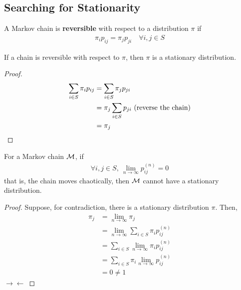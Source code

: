 \documentclass{article}
\newcommand{\upn}[0]{^{(n)}}
\begin{document}
    \subsection{Searching for Stationarity}
    \begin{definition}
    	A Markov chain is \textbf{reversible} with respect to a distribution $\pi$ if 
	    \begin{align}
	    	\pi_i p_{ij} = \pi_j p_{ji}\quad \forall i, j \in S
	    \end{align}
	\end{definition}

	\begin{theorem}
		If a chain is reversible with respect to $\pi$, then $\pi$ is a stationary distribution.
	\end{theorem}
	
	\begin{proof}
		\begin{align}
			\sum_{i \in S} \pi_i p_{ij} &= \sum_{i \in S} \pi_j p_{ji} \\
			&= \pi_j \sum_{i \in S} p_{ji} \text{{ (reverse the chain)}}\\
			&= \pi_j
		\end{align}
	\end{proof}
	
	\begin{proposition}
		For a Markov chain $\mathcal{{M}}$, if
		\begin{align}
			\forall i, j \in S,\ \lim_{n\to\infty} p_{ij}\upn = 0
		\end{align}
		that is, the chain moves chaotically, 
		then $\mathcal{{M}}$ cannot have a stationary distribution.
	\end{proposition}
	
	\begin{proof}
		Suppose, for contradiction, there is a stationary distribution $\pi$. Then,
		\begin{align}
			\pi_j &= \lim_{n \to \infty} \pi_j \\
			&= \lim_{n \to \infty} \sum_{i \in S} \pi_i p_{ij}\upn \\
			&= \sum_{i \in S} \lim_{n \to \infty} \pi_i p_{ij}\upn \\
			&= \sum_{i \in S} \pi_i \lim_{n \to \infty} p_{ij}\upn \\
			&= 0 \neq 1
		\end{align}
		$\rightarrow\leftarrow$
	\end{proof}
	
\end{document}
